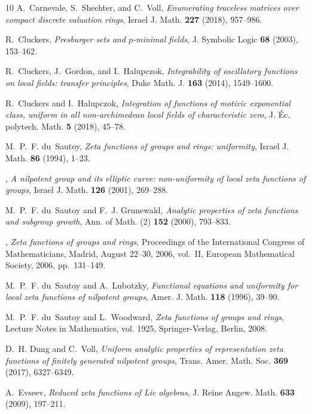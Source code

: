\documentclass[11pt,a4paper]{amsart}
\theoremstyle{plain}
\theoremstyle{remark}
\begin{document}
\begin{thebibliography}{10}
A.~Carnevale, S.~Shechter, and C.~Voll, \emph{Enumerating traceless matrices
  over compact discrete valuation rings}, Israel J. Math. \textbf{227} (2018),
  957--986.

R.~Cluckers, \emph{Presburger sets and {$p$}-minimal fields}, J. Symbolic Logic
  \textbf{68} (2003), 153--162.

R.~Cluckers, J.~Gordon, and I.~Halupczok, \emph{Integrability of oscillatory
  functions on local fields: transfer principles}, Duke Math. J. \textbf{163}
  (2014), 1549--1600.

R.~Cluckers and I.~Halupczok, \emph{Integration of functions of motivic
  exponential class, uniform in all non-archimedean local fields of
  characteristic zero}, J. \'{E}c. polytech. Math. \textbf{5} (2018), 45--78.

M.~P.~F. du~Sautoy, \emph{Zeta functions of groups and rings: uniformity},
  Israel J. Math. \textbf{86} (1994), 1--23.

\bysame, \emph{A nilpotent group and its elliptic curve: non-uniformity of
  local zeta functions of groups}, Israel J. Math. \textbf{126} (2001),
  269--288.

M.~P.~F. du~Sautoy and F.~J. Grunewald, \emph{Analytic properties of zeta
  functions and subgroup growth}, Ann. of Math. (2) \textbf{152} (2000),
  793--833.

\bysame, \emph{Zeta functions of groups and rings}, Proceedings of the
  International Congress of Mathematicians, Madrid, August 22--30, 2006,
  vol.~II, European Mathematical Society, 2006, pp.~131--149.

M.~P.~F. du~Sautoy and A.~Lubotzky, \emph{Functional equations and uniformity
  for local zeta functions of nilpotent groups}, Amer. J. Math. \textbf{118}
  (1996), 39--90.

M.~P.~F. du~Sautoy and L.~Woodward, \emph{Zeta functions of groups and rings},
  Lecture Notes in Mathematics, vol. 1925, Springer-Verlag, Berlin, 2008.

D.~H. Dung and C.~Voll, \emph{Uniform analytic properties of representation
  zeta functions of finitely generated nilpotent groups}, Trans. Amer. Math.
  Soc. \textbf{369} (2017), 6327--6349.

A.~Evseev, \emph{Reduced zeta functions of {L}ie algebras}, J. Reine Angew.
  Math. \textbf{633} (2009), 197--211.


\end{thebibliography}
\end{document}
